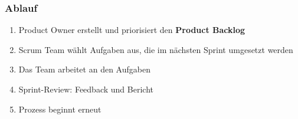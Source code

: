 \documentclass[12pt,A4]{extarticle}
\begin{document}
\subsubsection{Ablauf}
\begin{enumerate}
  \item{Product Owner erstellt und priorisiert den \textbf{Product Backlog}}
  \item{Scrum Team wählt Aufgaben aus, die im nächsten Sprint umgesetzt werden}
  \item{Das Team arbeitet an den Aufgaben}
  \item{Sprint-Review: Feedback und Bericht}
  \item{Prozess beginnt erneut}
\end{enumerate}
\end{document}
